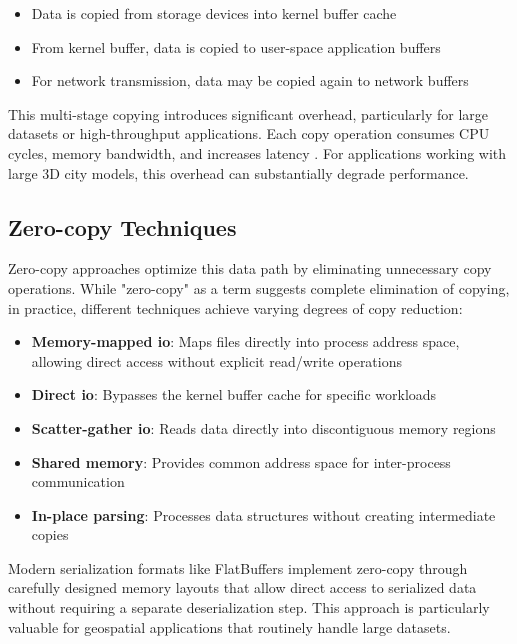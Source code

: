 \begin{itemize}
  \item Data is copied from storage devices into kernel buffer cache
  \item From kernel buffer, data is copied to user-space application buffers
  \item For network transmission, data may be copied again to network buffers
\end{itemize}

This multi-stage copying introduces significant overhead, particularly for large datasets or high-throughput applications. Each copy operation consumes CPU cycles, memory bandwidth, and increases latency \citep{song2012performance}. For applications working with large 3D city models, this overhead can substantially degrade performance.

\subsection{Zero-copy Techniques}
\label{tb:zero_copy_techniques}
Zero-copy approaches optimize this data path by eliminating unnecessary copy operations. While "zero-copy" as a term suggests complete elimination of copying, in practice, different techniques achieve varying degrees of copy reduction:

\begin{itemize}
  \item \textbf{Memory-mapped \ac{io}}: Maps files directly into process address space, allowing direct access without explicit read/write operations
  \item \textbf{Direct \ac{io}}: Bypasses the kernel buffer cache for specific workloads
  \item \textbf{Scatter-gather \ac{io}}: Reads data directly into discontiguous memory regions
  \item \textbf{Shared memory}: Provides common address space for inter-process communication
  \item \textbf{In-place parsing}: Processes data structures without creating intermediate copies
\end{itemize}

Modern serialization formats like FlatBuffers implement zero-copy through carefully designed memory layouts that allow direct access to serialized data without requiring a separate deserialization step. This approach is particularly valuable for geospatial applications that routinely handle large datasets.
